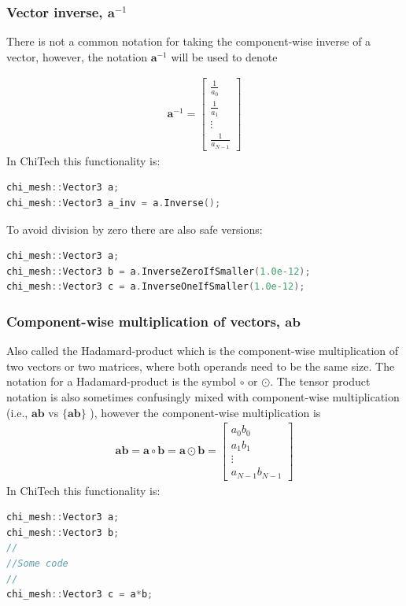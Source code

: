 \documentclass[11pt,letterpaper,titlepage]{article}
\newcommand{\beqn}{\begin{equation}
	\begin{aligned}}
\newcommand{\eeqn}{\end{aligned}
	\end{equation}}
\numberwithin{equation}{section}
\begin{document}
\subsubsection{Vector inverse, $\mathbf{a}^{-1}$}
There is not a common notation for taking the component-wise inverse of a vector, however, the notation $\mathbf{a}^{-1}$ will be used to denote

\beqn
\mathbf{a}^{-1} = 
\begin{bmatrix}
\frac{1}{a_0} \\
\frac{1}{a_1} \\
\vdots  \\
\frac{1}{a_{N-1}}
\end{bmatrix}
\eeqn 
\newline
\newline
In ChiTech this functionality is:
\begin{lstlisting}[language=c++]
chi_mesh::Vector3 a;
chi_mesh::Vector3 a_inv = a.Inverse();
\end{lstlisting}

To avoid division by zero there are also safe versions:
\begin{lstlisting}[language=c++]
chi_mesh::Vector3 a;
chi_mesh::Vector3 b = a.InverseZeroIfSmaller(1.0e-12);
chi_mesh::Vector3 c = a.InverseOneIfSmaller(1.0e-12);
\end{lstlisting}

\subsubsection{Component-wise multiplication of vectors, $\mathbf{a}\mathbf{b}$}
Also called the Hadamard-product which is the component-wise multiplication of two vectors or two matrices, where both operands need to be the same size. The notation for a Hadamard-product is the symbol $\circ$ or $\odot$. The tensor product notation is also sometimes confusingly mixed with component-wise multiplication (i.e., $\mathbf{a}\mathbf{b}$ vs $\{ \mathbf{a}\mathbf{b} \}$ ), however the component-wise multiplication is
\beqn
\mathbf{a}\mathbf{b} = 
\mathbf{a} \circ \mathbf{b} = 
\mathbf{a} \odot \mathbf{b} = 
\begin{bmatrix}
a_0 b_0 \\
a_1 b_1 \\
\vdots \\
a_{N-1}b_{N-1}
\end{bmatrix}
\eeqn
\newline
\newline
In ChiTech this functionality is:
\begin{lstlisting}[language=c++]
chi_mesh::Vector3 a;
chi_mesh::Vector3 b;
//
//Some code
//
chi_mesh::Vector3 c = a*b;
\end{lstlisting}
\end{document}
